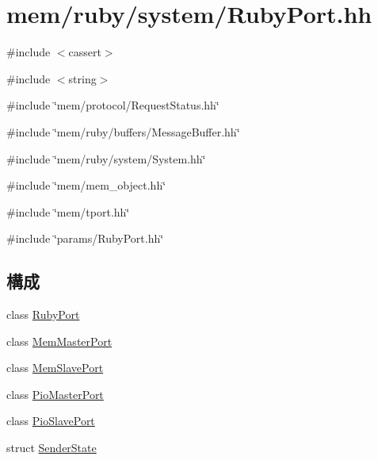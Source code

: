 \hypertarget{RubyPort_8hh}{
\section{mem/ruby/system/RubyPort.hh}
\label{RubyPort_8hh}
}
{\ttfamily \#include $<$cassert$>$}\par
{\ttfamily \#include $<$string$>$}\par
{\ttfamily \#include \char`\"{}mem/protocol/RequestStatus.hh\char`\"{}}\par
{\ttfamily \#include \char`\"{}mem/ruby/buffers/MessageBuffer.hh\char`\"{}}\par
{\ttfamily \#include \char`\"{}mem/ruby/system/System.hh\char`\"{}}\par
{\ttfamily \#include \char`\"{}mem/mem\_\-object.hh\char`\"{}}\par
{\ttfamily \#include \char`\"{}mem/tport.hh\char`\"{}}\par
{\ttfamily \#include \char`\"{}params/RubyPort.hh\char`\"{}}\par
\subsection*{構成}
\begin{DoxyCompactItemize}
\item 
class \hyperlink{classRubyPort}{RubyPort}
\item 
class \hyperlink{classRubyPort_1_1MemMasterPort}{MemMasterPort}
\item 
class \hyperlink{classRubyPort_1_1MemSlavePort}{MemSlavePort}
\item 
class \hyperlink{classRubyPort_1_1PioMasterPort}{PioMasterPort}
\item 
class \hyperlink{classRubyPort_1_1PioSlavePort}{PioSlavePort}
\item 
struct \hyperlink{structRubyPort_1_1SenderState}{SenderState}
\end{DoxyCompactItemize}
